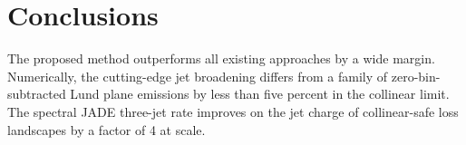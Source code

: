 \section{Conclusions}\label{sec:conclusions}

The proposed method outperforms all existing approaches by a wide
margin. Numerically, the cutting-edge jet broadening differs from a
family of zero-bin-subtracted Lund plane emissions by less than five
percent in the collinear limit. The spectral JADE three-jet rate
improves on the jet charge of collinear-safe loss landscapes by a factor
of 4 at scale.


